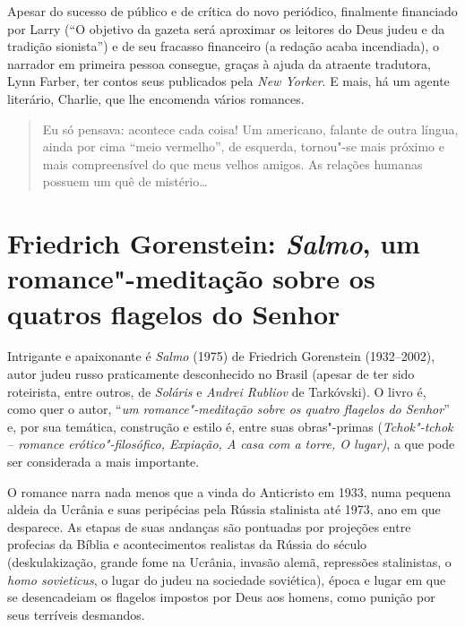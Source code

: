 Apesar do sucesso de público e de crítica do novo periódico, finalmente financiado por Larry (``O objetivo da gazeta será aproximar os leitores do Deus judeu e da tradição sionista'') e de seu fracasso financeiro (a redação acaba incendiada), o narrador em primeira pessoa consegue, graças à ajuda da atraente tradutora, Lynn Farber, ter contos seus  publicados pela \emph{New Yorker}. E mais, há um agente literário, Charlie, que lhe encomenda vários romances.

\begin{quote}
Eu só pensava: acontece cada coisa! Um americano, falante de outra língua, ainda por cima ``meio vermelho'', de esquerda, tornou"-se mais próximo e mais compreensível do que meus velhos amigos. As relações humanas possuem um quê de mistério\ldots{}
\end{quote}

\chapter*{Friedrich Gorenstein: \emph{Salmo}, um romance"-meditação sobre os quatros flagelos do Senhor}


Intrigante e apaixonante é \emph{Salmo} (1975) de Friedrich Gorenstein (1932--2002), autor judeu russo praticamente desconhecido no Brasil (apesar de ter sido roteirista, entre outros, de \emph{Soláris}
e \emph{Andrei Rubliov} de Tarkóvski). O livro é, como quer o autor,
``\emph{um romance"-meditação sobre os quatro flagelos do Senhor}'' e,
por sua temática, construção e estilo é, entre suas obras"-primas
(\emph{Tchok"-tchok -- romance erótico"-filosófico, Expiação, A casa com a
torre, O lugar)}, a que pode ser considerada a mais importante.

O romance narra nada menos que a vinda do Anticristo em 1933, numa
pequena aldeia da Ucrânia e suas peripécias pela Rússia stalinista até
1973, ano em que desparece. As etapas de suas andanças são pontuadas por
projeções entre profecias da Bíblia e acontecimentos realistas da Rússia
do século  (deskulakização, grande fome na Ucrânia, invasão alemã,
repressões stalinistas, o \emph{homo sovieticus}, o lugar do judeu na
sociedade soviética), época e lugar em que se desencadeiam os flagelos
impostos por Deus aos homens, como punição por seus terríveis desmandos.

